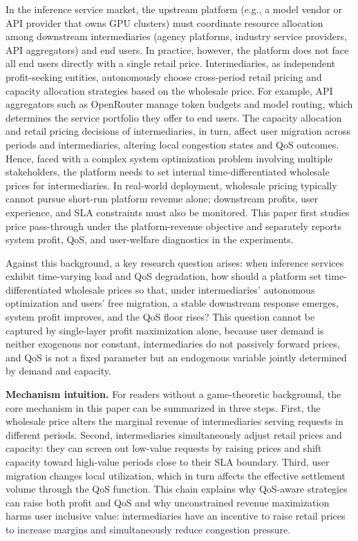 \documentclass[11pt,a4paper]{article}
\begin{document}
In the inference service market, the upstream platform (e.g., a model vendor or API provider that owns GPU clusters) must coordinate resource allocation among downstream intermediaries (agency platforms, industry service providers, API aggregators) and end users. In practice, however, the platform does not face all end users directly with a single retail price. Intermediaries, as independent profit-seeking entities, autonomously choose cross-period retail pricing and capacity allocation strategies based on the wholesale price. For example, API aggregators such as OpenRouter manage token budgets and model routing, which determines the service portfolio they offer to end users. The capacity allocation and retail pricing decisions of intermediaries, in turn, affect user migration across periods and intermediaries, altering local congestion states and QoS outcomes. Hence, faced with a complex system optimization problem involving multiple stakeholders, the platform needs to set internal time-differentiated wholesale prices for intermediaries. In real-world deployment, wholesale pricing typically cannot pursue short-run platform revenue alone; downstream profits, user experience, and SLA constraints must also be monitored. This paper first studies price pass-through under the platform-revenue objective and separately reports system profit, QoS, and user-welfare diagnostics in the experiments.

Against this background, a key research question arises: when inference services exhibit time-varying load and QoS degradation, how should a platform set time-differentiated wholesale prices so that, under intermediaries' autonomous optimization and users' free migration, a stable downstream response emerges, system profit improves, and the QoS floor rises? This question cannot be captured by single-layer profit maximization alone, because user demand is neither exogenous nor constant, intermediaries do not passively forward prices, and QoS is not a fixed parameter but an endogenous variable jointly determined by demand and capacity.

\textbf{Mechanism intuition.} For readers without a game-theoretic background, the core mechanism in this paper can be summarized in three steps. First, the wholesale price alters the marginal revenue of intermediaries serving requests in different periods. Second, intermediaries simultaneously adjust retail prices and capacity: they can screen out low-value requests by raising prices and shift capacity toward high-value periods close to their SLA boundary. Third, user migration changes local utilization, which in turn affects the effective settlement volume through the QoS function. This chain explains why QoS-aware strategies can raise both profit and QoS and why unconstrained revenue maximization harms user inclusive value: intermediaries have an incentive to raise retail prices to increase margins and simultaneously reduce congestion pressure.
\end{document}

